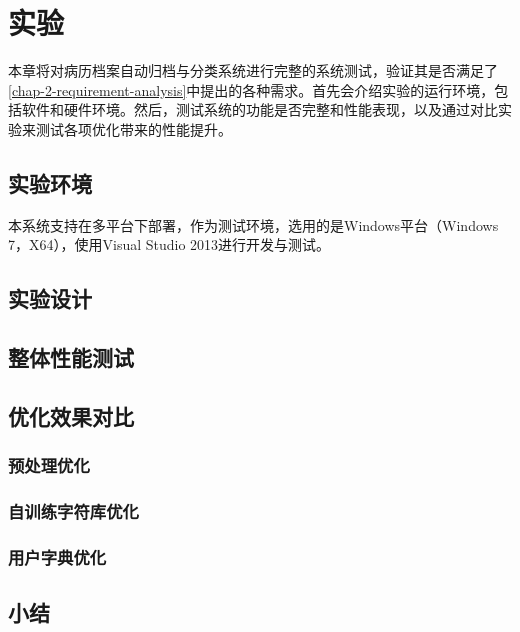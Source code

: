 \chapter{实验}
\label{chap:experiments}
本章将对病历档案自动归档与分类系统进行完整的系统测试，验证其是否满足了\autoref{chap-2-requirement-analysis}中提出的各种需求。首先会介绍实验的运行环境，包括软件和硬件环境。然后，测试系统的功能是否完整和性能表现，以及通过对比实验来测试各项优化带来的性能提升。
\section{实验环境}
本系统支持在多平台下部署，作为测试环境，选用的是Windows平台（Windows 7，X64），使用Visual Studio 2013进行开发与测试。
\section{实验设计}


\section{整体性能测试}

\section{优化效果对比}
\subsection{预处理优化}

\subsection{自训练字符库优化}

\subsection{用户字典优化}

\section{小结}
